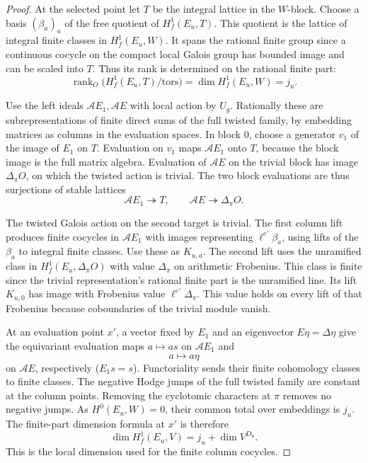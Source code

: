 \begin{proof}
At the selected point let \(T\) be the integral lattice
in the \(W\)-block. Choose a basis \((\beta_a)_a\) of
the free quotient of \(H^1_f(E_u,T)\). This quotient
is the lattice of integral finite classes in
\(H^1_f(E_u,W)\). It spans the rational finite group
since a continuous cocycle on the compact local Galois
group has bounded image and can be scaled into \(T\).
Thus its rank is determined on the rational finite part:
\[
 \operatorname{rank}_O\bigl(H^1_f(E_u,T)/\mathrm{tors}\bigr)=\dim H^1_f(E_u,W)=j_u.
\]


Use the left ideals \(\mathcal A E_1,\mathcal A E\)
with local action by \(U_g\). Rationally these are
subrepresentations of finite direct sums of the full
twisted family, by embedding matrices as columns in
the evaluation spaces. In block \(0\), choose a
generator \(v_1\) of the image of \(E_1\) on \(T\).
Evaluation on \(v_1\) maps \(\mathcal A E_1\) onto
\(T\), because the block image is the full matrix
algebra. Evaluation of \(\mathcal A E\) on the
trivial block has image \(\Delta_\pi O\), on which
the twisted action is trivial. The two block evaluations are thus surjections of stable lattices
\[
 \mathcal A E_1\twoheadrightarrow T,\qquad \mathcal A E\twoheadrightarrow\Delta_\pi O.
\]

The twisted Galois action on the second target is trivial.
The first column lift produces finite cocycles in
\(\mathcal A E_1\) with images representing
\(\ell^{e'}\beta_a\), using lifts of the \(\beta_a\)
to integral finite classes. Use these as \(K_{u,a}\).
The second lift uses the unramified class in
\(H^1_f(E_u,\Delta_\pi O)\) with value \(\Delta_\pi\)
on arithmetic Frobenius. This class is finite since
the trivial representation's rational finite part
is the unramified line. Its lift \(K_{u,0}\) has image
with Frobenius value \(\ell^{e'}\Delta_\pi\). This
value holds on every lift of that Frobenius because
coboundaries of the trivial module vanish.

At an evaluation point \(x'\), a vector fixed by \(E_1\)
and an eigenvector \(E\eta=\Delta\eta\) give the equivariant
evaluation maps \(a\mapsto as\) on \(\mathcal A E_1\) and
\[
 a\mapsto a\eta
\]
on \(\mathcal A E\), respectively
(\(E_1s=s\)). Functoriality sends their finite cohomology
classes to finite classes. The negative Hodge jumps of the full
twisted family are constant at the column points. Removing the
cyclotomic characters at \(\pi\) removes no negative jumps.
As \(H^0(E_u,W)=0\), their common total over embeddings is
\(j_u\). The finite-part dimension formula at \(x'\) is therefore
\[
        \dim H^1_f(E_u,V)=j_u+\dim V^{D_u}.
\]
This is the local dimension used for the finite column cocycles.


\end{proof}
